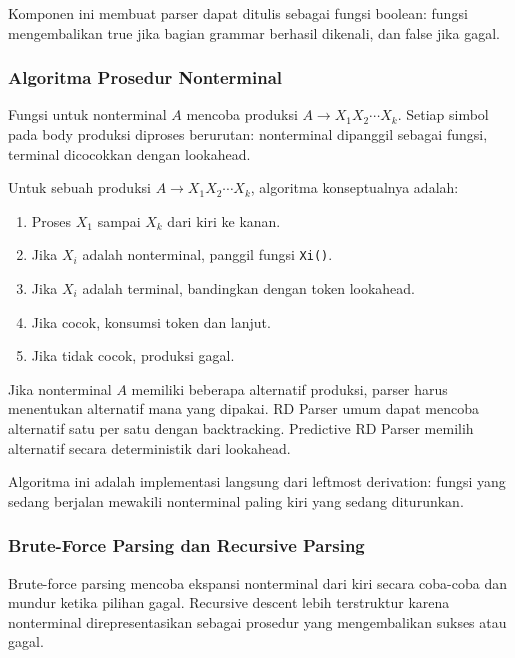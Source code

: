 Komponen ini membuat parser dapat ditulis sebagai fungsi boolean: fungsi mengembalikan true jika bagian grammar berhasil dikenali, dan false jika gagal.

\subsubsection{Algoritma Prosedur Nonterminal}

\begin{jawab}
Fungsi untuk nonterminal $A$ mencoba produksi $A\rightarrow X_1X_2\cdots X_k$. Setiap simbol pada body produksi diproses berurutan: nonterminal dipanggil sebagai fungsi, terminal dicocokkan dengan lookahead.
\end{jawab}

Untuk sebuah produksi $A\rightarrow X_1X_2\cdots X_k$, algoritma konseptualnya adalah:
\begin{enumerate}
    \item Proses $X_1$ sampai $X_k$ dari kiri ke kanan.
    \item Jika $X_i$ adalah nonterminal, panggil fungsi \texttt{Xi()}.
    \item Jika $X_i$ adalah terminal, bandingkan dengan token lookahead.
    \item Jika cocok, konsumsi token dan lanjut.
    \item Jika tidak cocok, produksi gagal.
\end{enumerate}

Jika nonterminal $A$ memiliki beberapa alternatif produksi, parser harus menentukan alternatif mana yang dipakai. RD Parser umum dapat mencoba alternatif satu per satu dengan backtracking. Predictive RD Parser memilih alternatif secara deterministik dari lookahead.

Algoritma ini adalah implementasi langsung dari leftmost derivation: fungsi yang sedang berjalan mewakili nonterminal paling kiri yang sedang diturunkan.

\subsubsection{Brute-Force Parsing dan Recursive Parsing}

\begin{jawab}
Brute-force parsing mencoba ekspansi nonterminal dari kiri secara coba-coba dan mundur ketika pilihan gagal. Recursive descent lebih terstruktur karena nonterminal direpresentasikan sebagai prosedur yang mengembalikan sukses atau gagal.
\end{jawab}

